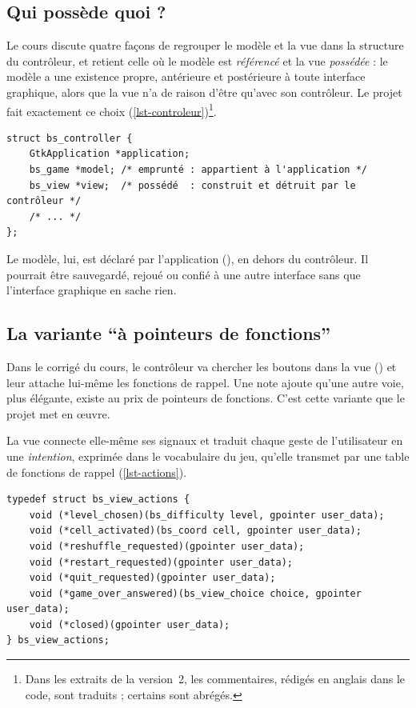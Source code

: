\subsection{Qui possède quoi ?}

Le cours discute quatre façons de regrouper le modèle et la vue dans la structure du
contrôleur, et retient celle où le modèle est \emph{référencé} et la vue \emph{possédée} :
le modèle a une existence propre, antérieure et postérieure à toute interface graphique,
alors que la vue n'a de raison d'être qu'avec son contrôleur. Le projet fait exactement ce
choix (\cref{lst-controleur})\footnote{Dans les extraits de la version~2, les commentaires,
rédigés en anglais dans le code, sont traduits ; certains sont abrégés.}.

\begin{lstlisting}[caption={La structure du contrôleur (\fichier{src/ui/controller.c}).},
                   label={lst-controleur}]
struct bs_controller {
    GtkApplication *application;
    bs_game *model; /* emprunté : appartient à l'application */
    bs_view *view;  /* possédé  : construit et détruit par le contrôleur */
    /* ... */
};
\end{lstlisting}

Le modèle, lui, est déclaré par l'application (), en dehors du
contrôleur. Il pourrait être sauvegardé, rejoué ou confié à une autre interface sans que
l'interface graphique en sache rien.

\subsection{La variante \enquote{à pointeurs de fonctions}}
\label{sec-pointeurs}

Dans le corrigé du cours, le contrôleur va chercher les boutons dans la vue
() et leur attache lui-même les fonctions de rappel. Une note
ajoute qu'une autre voie, plus élégante, existe au prix de pointeurs de fonctions. C'est
cette variante que le projet met en œuvre.

La vue connecte elle-même ses signaux et traduit chaque geste de l'utilisateur en une
\emph{intention}, exprimée dans le vocabulaire du jeu, qu'elle transmet par une table de
fonctions de rappel (\cref{lst-actions}).

\begin{lstlisting}[caption={Les intentions rapportées par la vue (\fichier{src/ui/view.h}).},
                   label={lst-actions}]
typedef struct bs_view_actions {
    void (*level_chosen)(bs_difficulty level, gpointer user_data);
    void (*cell_activated)(bs_coord cell, gpointer user_data);
    void (*reshuffle_requested)(gpointer user_data);
    void (*restart_requested)(gpointer user_data);
    void (*quit_requested)(gpointer user_data);
    void (*game_over_answered)(bs_view_choice choice, gpointer user_data);
    void (*closed)(gpointer user_data);
} bs_view_actions;
\end{lstlisting}

